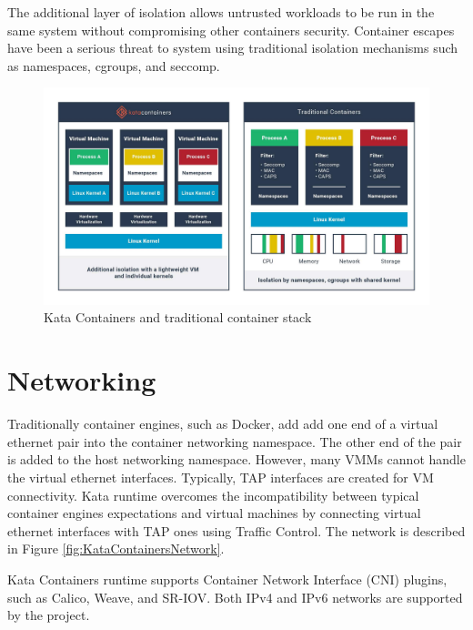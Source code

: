 The additional layer of isolation allows untrusted workloads to be run in the same system without compromising other containers security. Container escapes \cite{CVE-2020-14386}\cite{CVE-2019-5736} have been a serious threat to system using traditional isolation mechanisms such as namespaces, cgroups, and seccomp.

\begin{figure}[ht]
  \begin{center}
    \includegraphics[width=13.5cm]{images/KataContainersStack.jpg}
    \caption{Kata Containers and traditional container stack \cite{KataContainers}}
    \label{fig:KataContainersStack}
  \end{center}
\end{figure} 

\section{Networking}

Traditionally container engines, such as Docker, add add one end of a virtual ethernet pair into the container networking namespace. The other end of the pair is added to the host networking namespace. However, many VMMs cannot handle the virtual ethernet interfaces. Typically, TAP interfaces are created for VM connectivity. Kata runtime overcomes the incompatibility between typical container engines expectations and virtual machines by connecting virtual ethernet interfaces with TAP ones using Traffic Control. The network is described in Figure \ref{fig:KataContainersNetwork}. \cite{KataContainersArchitecture}

Kata Containers runtime supports Container Network Interface (CNI) \cite{CNI} plugins, such as Calico, Weave, and SR-IOV. Both IPv4 and IPv6 networks are supported by the project.

